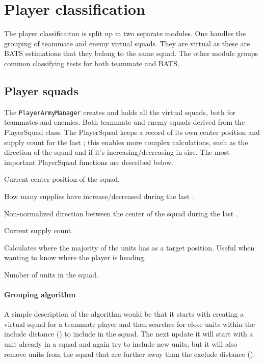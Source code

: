 \section{Player classification}
The player classificaiton is split up in two separate modules. One handles the grouping of teammate and enemy virtual squads. They are virtual as these are BATS estimations that they belong to the same squad. The other module groups common classifying tests for both teammate and BATS. 

\subsection{Player squads}
The \texttt{PlayerArmyManager} creates and holds all the virtual squads, both for teammates and enemies. Both teammate and enemy squads derived from the PlayerSquad class. The PlayerSquad keeps a record of its own center position and supply count for the last \classificationMeasureTimeTotal; this enables more complex calculations, such as the direction of the squad and if it's increasing/decreasing in size. The most important PlayerSquad functions are described below.
\begin{function_description}
	\item[\texttt{TilePosition getCenter()}] Current center position of the squad.
	\item[\texttt{int getDeltaSupplyCount()}] How many supplies have increase/decreased during the last \classificationMeasureTimeTotal.
	\item[\texttt{TilePosition getDirection()}] Non-normalized direction between the center of the squad during the last \classificationMeasureTimeTotal.
	\item[\texttt{int getSupplyCount()}] Current supply count.
	\item[\texttt{TilePosition getTargetPosition()}] Calculates where the majority of the units has as a target position. Useful when wanting to know where the player is heading.
	\item[\texttt{int getUnitCount()}] Number of units in the squad.	
\end{function_description}

\paragraph{Grouping algorithm}
A simple description of the algorithm would be that it starts with creating a virtual squad for a teammate player and then searches for close units within the include distance (\classificationSquadIncludeDistance) to include in the squad. The next update it will start with a unit already in a squad and again try to include new units, but it will also remove units from the squad that are further away than the exclude distance (\classificationSquadExcludeDistance).

